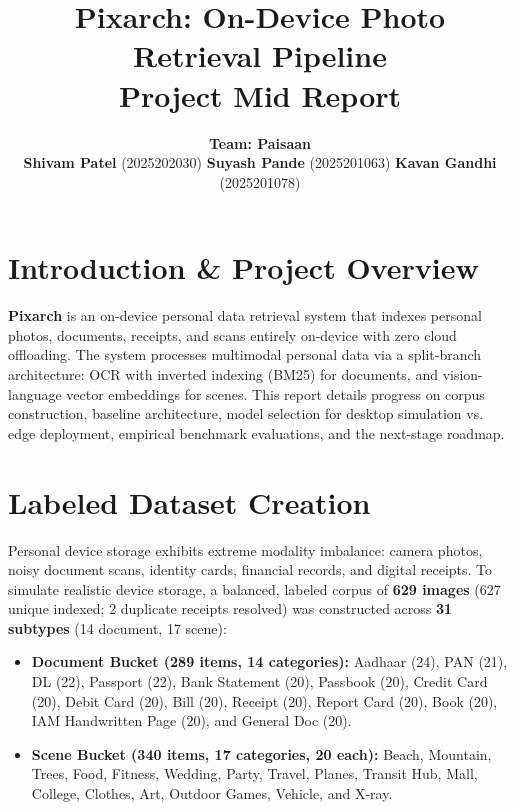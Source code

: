 \documentclass[10.5pt,twocolumn]{article}
\title{\vspace{-22pt}\textbf{\Large Pixarch: On-Device Photo Retrieval Pipeline}\\[1pt]\large Project Mid Report\vspace{-7pt}}
\author{
  \textbf{Team: Paisaan}\\[2pt]
  \textbf{Shivam Patel} (2025202030) \quad
  \textbf{Suyash Pande} (2025201063) \quad
  \textbf{Kavan Gandhi} (2025201078)\\[1pt]
}
\date{}
\begin{document}
\maketitle

\section{Introduction \& Project Overview}
\textbf{Pixarch} is an on-device personal data retrieval system that indexes personal photos, documents, receipts, and scans entirely on-device with zero cloud offloading. The system processes multimodal personal data via a split-branch architecture: OCR with inverted indexing (BM25) for documents, and vision-language vector embeddings for scenes. This report details progress on corpus construction, baseline architecture, model selection for desktop simulation vs. edge deployment, empirical benchmark evaluations, and the next-stage roadmap.

\section{Labeled Dataset Creation}
Personal device storage exhibits extreme modality imbalance: camera photos, noisy document scans, identity cards, financial records, and digital receipts. To simulate realistic device storage, a balanced, labeled corpus of \textbf{629 images} (627 unique indexed; 2 duplicate receipts resolved) was constructed across \textbf{31 subtypes} (14 document, 17 scene):

\begin{itemize}
    \item \textbf{Document Bucket (289 items, 14 categories):} Aadhaar (24), PAN (21), DL (22), Passport (22), Bank Statement (20), Passbook (20), Credit Card (20), Debit Card (20), Bill (20), Receipt (20), Report Card (20), Book (20), IAM Handwritten Page (20), and General Doc (20).
    \item \textbf{Scene Bucket (340 items, 17 categories, 20 each):} Beach, Mountain, Trees, Food, Fitness, Wedding, Party, Travel, Planes, Transit Hub, Mall, College, Clothes, Art, Outdoor Games, Vehicle, and X-ray.
\end{itemize}
\end{document}
